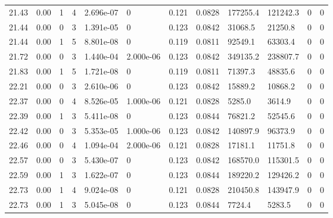 \documentclass[preview]{standalone}
\begin{document}
{{{{{{\begin{tabular}{L{1.2cm}C{1.2cm} C{0.3cm}C{0.5cm} C{1.4cm}C{1.4cm} C{1.4cm}C{1.4cm} C{1.6cm}C{1.6cm} C{1.6cm}C{1.6cm}}
  21.43  &  0.00  & 1     &  4 &  2.696e-07  & 0  &  0.121&   0.0828& 177255.4 & 121242.3   &  0 & 0  \\ 
  21.44  &  0.00  & 0     &  3 &  1.391e-05  & 0  &  0.123&   0.0842& 31068.5 & 21250.8   &  0 & 0  \\ 
  21.44  &  0.00  & 1     &  5 &  8.801e-08  & 0  &  0.119&   0.0811& 92549.1 & 63303.4   &  0 & 0  \\ 
  21.72  &  0.00  & 0     &  3 &  1.440e-04  & 2.000e-06  &  0.123&   0.0842& 349135.2 & 238807.7   &  0 & 0  \\ 
  21.83  &  0.00  & 1     &  5 &  1.721e-08  & 0  &  0.119&   0.0811& 71397.3 & 48835.6   &  0 & 0  \\ 
  22.21  &  0.00  & 0     &  3 &  2.610e-06  & 0  &  0.123&   0.0842& 15889.2 & 10868.2   &  0 & 0  \\ 
  22.37  &  0.00  & 0     &  4 &  8.526e-05  & 1.000e-06  &  0.121&   0.0828& 5285.0 & 3614.9   &  0 & 0  \\ 
  22.39  &  0.00  & 1     &  3 &  5.411e-08  & 0  &  0.123&   0.0844& 76821.2 & 52545.6   &  0 & 0  \\ 
  22.42  &  0.00  & 0     &  3 &  5.353e-05  & 1.000e-06  &  0.123&   0.0842& 140897.9 & 96373.9   &  0 & 0  \\ 
  22.46  &  0.00  & 0     &  4 &  1.094e-04  & 2.000e-06  &  0.121&   0.0828& 17181.1 & 11751.8   &  0 & 0  \\ 
  22.57  &  0.00  & 0     &  3 &  5.430e-07  & 0  &  0.123&   0.0842& 168570.0 & 115301.5   &  0 & 0  \\ 
  22.59  &  0.00  & 1     &  3 &  1.622e-07  & 0  &  0.123&   0.0844& 189220.2 & 129426.2   &  0 & 0  \\ 
  22.73  &  0.00  & 1     &  4 &  9.024e-08  & 0  &  0.121&   0.0828& 210450.8 & 143947.9   &  0 & 0  \\ 
  22.73  &  0.00  & 1     &  3 &  5.045e-08  & 0  &  0.123&   0.0844& 7724.4 & 5283.5   &  0 & 0  \\ 
\hline 
\end{tabular} 

}}}}}}
\end{document}
